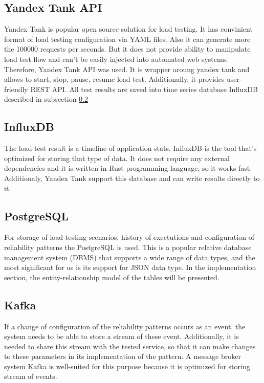 \subsection{Yandex Tank API}\label{subsec:ya-api}
Yandex Tank is popular open source solution for load testing. It has convinient format of load testing configuration via YAML files. Also it can generate more the 100000 requests per seconds. But it does not provide ability to manipulate load test flow and can't be easily injected into automated web systems. Therefore, Yandex Tank API was used. It is wrapper aroung yandex tank and allows to start, stop, pause, resume load test. Additionally, it provides user-friendly REST API. All test results are saved into time series database InfluxDB described in subsection \ref{subsec:influx}

\subsection{InfluxDB}\label{subsec:influx}
The load test result is a timeline of application stats. InfluxDB is the tool that's optimized for storing that type of data. It does not require any external dependencies and it is written in Rust programming language, so it works fast. Additionaly, Yandex Tank support this database and can write results directly to it.

\subsection{PostgreSQL}\label{subsec:postgre}
For storage of load testing scenarios, history of exectutions and configuration of reliability patterns the PostgreSQL is used. This is a popular relative database management system (DBMS) that supports a wide range of data types, and the most significant for us is its support for JSON data type. In the implementation section, the entity-relationship model of the tables will be presented.

\subsection{Kafka}\label{subsec:kafka}
If a change of configuration of the reliability patterns occurs as an event, the system needs to be able to store a stream of these event. Additionally, it is needed to share this stream with the tested service, so that it can make changes to these parameters in its implementation of the pattern. A message broker system Kafka is well-suited for this purpose because it is optimized for storing stream of events.

